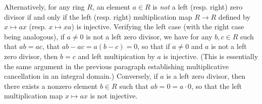 \begin{example}
    Alternatively, for any ring \(R\), an element \(a \in R\) is \emph{not} a
    left (resp. right) zero divisor if and only if the left (resp. right)
    multiplication map \(R \to R\) defined by \(x \mapsto ax\) (resp. \(x
    \mapsto xa\)) is injective. Verifying the left case (with the right case
    being analogous), if \(a \neq 0\) is not a left zero divisor, we have for
    any \(b, c \in R\) such that \(ab = ac\), that \(ab - ac = a(b - c) = 0\),
    so that if \(a \neq 0\) and \(a\) is not a left zero divisor, then \(b = c\)
    and left multipication by \(a\) is injective. (This is essentially the same
    argument in the previous paragraph establishing multiplicative cancellation
    in an integral domain.) Conversely, if \(a\) is a left zero divisor, then
    there exists a nonzero element \(b \in R\) such that \(ab = 0 = a \cdot 0\),
    so that the left multiplication map \(x \mapsto ax\) is not injective. 
\end{example}

